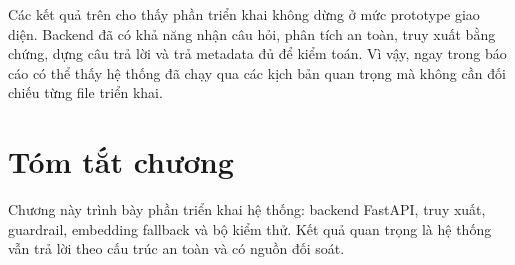 Các kết quả trên cho thấy phần triển khai không dừng ở mức prototype giao diện. Backend đã có khả năng nhận câu hỏi, phân tích an toàn, truy xuất bằng chứng, dựng câu trả lời và trả metadata đủ để kiểm toán. Vì vậy, ngay trong báo cáo có thể thấy hệ thống đã chạy qua các kịch bản quan trọng mà không cần đối chiếu từng file triển khai.

\section{Tóm tắt chương}

Chương này trình bày phần triển khai hệ thống: backend FastAPI, truy xuất, guardrail, embedding fallback và bộ kiểm thử. Kết quả quan trọng là hệ thống vẫn trả lời theo cấu trúc an toàn và có nguồn đối soát.
